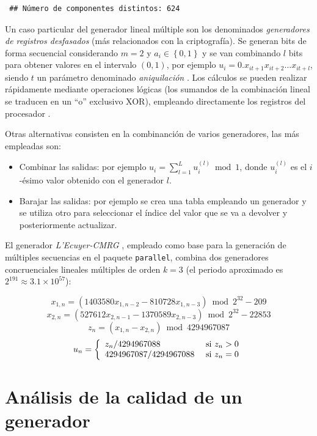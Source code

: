 \documentclass[
  spanish,
  10pt,
]{book}
\theoremstyle{break}
\theoremstyle{nonumberplain}
\begin{document}
\begin{verbatim}
 ## Número de componentes distintos: 624
\end{verbatim}

Un caso particular del generador lineal múltiple son los denominados \emph{generadores de registros desfasados} (más relacionados con la criptografía).
Se generan bits de forma secuencial considerando \(m=2\) y \(a_{i} \in \left \{ 0,1\right \}\) y se van combinando \(l\) bits para obtener valores en el intervalo \((0, 1)\), por ejemplo \(u_i = 0 . x_{it+1} x_{it+2} \ldots x_{it+l}\), siendo \(t\) un parámetro denominado \emph{aniquilación} \citep{tausworthe1965}.
Los cálculos se pueden realizar rápidamente mediante operaciones lógicas (los sumandos de la combinación lineal se traducen en un ``o'' exclusivo XOR), empleando directamente los registros del procesador \citep[ver por ejemplo][Algoritmo 2.1]{ripley1987stochastic}.

Otras alternativas consisten en la combinanción de varios generadores, las más empleadas son:

\begin{itemize}
\item
  Combinar las salidas: por ejemplo \(u_{i}=\sum_{l=1}^L u_{i}^{(l)} \bmod 1\), donde \(u_{i}^{(l)}\) es el \(i\)-ésimo valor obtenido con el generador \(l\).
\item
  Barajar las salidas: por ejemplo se crea una tabla empleando un generador y se utiliza otro para seleccionar el índice del valor que se va a devolver y posteriormente actualizar.
\end{itemize}

El generador \emph{L'Ecuyer-CMRG} \citep{lecuyer99}, empleado como base para la generación de múltiples secuencias en el paquete \texttt{parallel}, combina dos generadores concruenciales lineales múltiples de orden \(k=3\) (el periodo aproximado es \(2^{191} \approx 3.1 \times 10^{57}\)):

\[x_{1,n} = (1403580 x_{1,n−2} − 810728 x_{1,n−3}) \bmod  2^{32} − 209\]
\[x_{2,n} = (527612 x_{2,n−1} − 1370589 x_{2,n−3}) \bmod  2^{32} − 22853\]
\[z_n = (x_{1,n} − x_{2,n}) \bmod  4294967087\]
\[
u_n =
\left\{
\begin{array}[c]{ll}
z_n/4294967088 & \text{ si } z_n > 0\\
4294967087/4294967088 & \text{ si } z_n = 0
\end{array}
\right.
\]

\section{Análisis de la calidad de un generador}\label{calgen}
\end{document}
